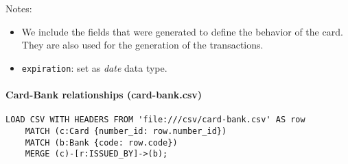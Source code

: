 {Notes:
\begin{itemize}
    \item We include the fields that were generated to define the behavior of the card. They are also used for the generation of the transactions.
    \item \texttt{expiration}: set as \textit{date} data type.
\end{itemize}

\paragraph{Card-Bank relationships (card-bank.csv)}

\begin{center}
\lstset{style=cypherStyle}
\begin{lstlisting}[caption={card-bank.csv}]
    LOAD CSV WITH HEADERS FROM 'file:///csv/card-bank.csv' AS row
    MATCH (c:Card {number_id: row.number_id})
    MATCH (b:Bank {code: row.code})
    MERGE (c)-[r:ISSUED_BY]->(b);
\end{lstlisting}
\end{center}
}